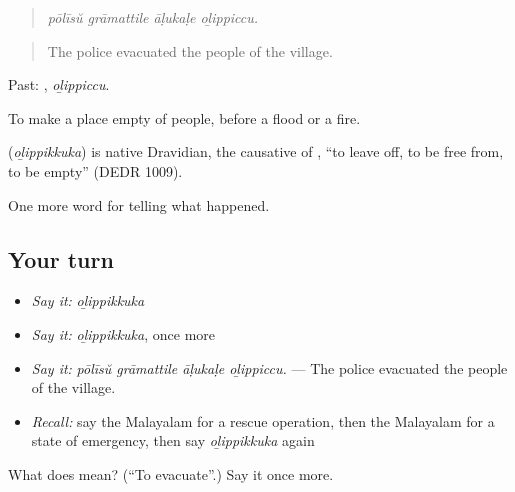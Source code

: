 \begin{quote}
\emph{pōlīsŭ grāmattile āḷukaḷe oḻippiccu.}
\end{quote}

\begin{quote}
The police evacuated the people of the village.
\end{quote}

Past: , \emph{oḻippiccu}.

To make a place empty of people, before a flood or a fire.

\begin{cousinweb}
\textbf{} (\emph{oḻippikkuka}) is native Dravidian, the causative of , \textquotedblleft{}to leave off, to be free from, to be empty\textquotedblright{} (DEDR 1009).
\end{cousinweb}

\begin{grammarlens}[title={What you've built}]
One more word for telling what happened.
\end{grammarlens}

\subsection*{Your turn}
\begin{itemize}
\raggedright
  \item \emph{Say it:} \emph{oḻippikkuka}
  \item \emph{Say it:} \emph{oḻippikkuka}, once more
  \item \emph{Say it:} \emph{pōlīsŭ grāmattile āḷukaḷe oḻippiccu.} — The police evacuated the people of the village.
  \item \emph{Recall:} say the Malayalam for a rescue operation, then the Malayalam for a state of emergency, then say \emph{oḻippikkuka} again
\end{itemize}

\begin{tcolorbox}[breakable,colback=teal!4,colframe=teal!35!black,title={Before you move on}]
What does  mean? (\textquotedblleft{}To evacuate\textquotedblright{}.) Say it once more.
\end{tcolorbox}
